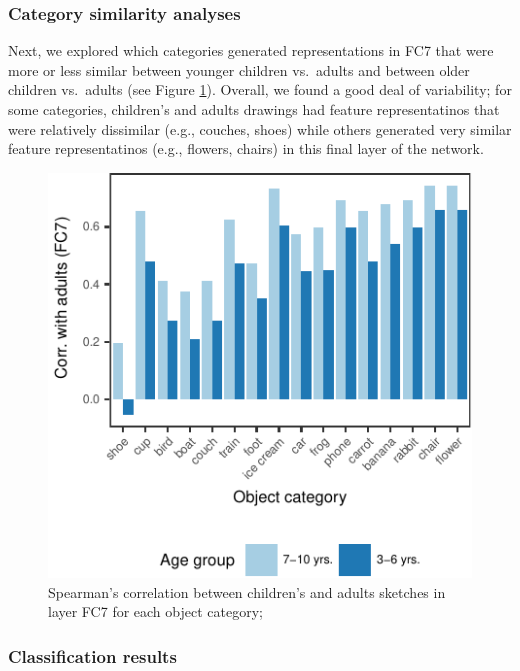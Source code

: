 \documentclass[10pt, letterpaper]{article}
\newenvironment{CodeChunk}{}{}
\begin{document}
\subsubsection{Category similarity
analyses}\label{category-similarity-analyses-1}

Next, we explored which categories generated representations in FC7 that
were more or less similar between younger children vs.~adults and
between older children vs.~adults (see Figure \ref{fig:simpleCorr}).
Overall, we found a good deal of variability; for some categories,
children's and adults drawings had feature representatinos that were
relatively dissimilar (e.g., couches, shoes) while others generated very
similar feature representatinos (e.g., flowers, chairs) in this final
layer of the network.

\begin{CodeChunk}
\begin{figure}[H]

{\centering \includegraphics{figs/simpleCorr-1} 

}

\caption[Spearman's correlation between children's and adults sketches in layer FC7 for each object category]{Spearman's correlation between children's and adults sketches in layer FC7 for each object category;}\label{fig:simpleCorr}
\end{figure}
\end{CodeChunk}

\subsubsection{Classification results}\label{classification-results}
\end{document}
